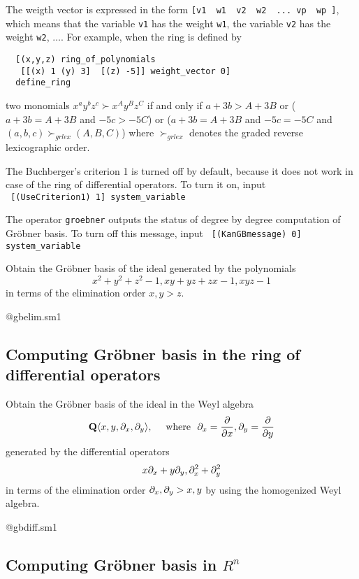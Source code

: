 The weigth vector is expressed in the form
{\tt [v1 \  w1 \ v2 \ w2 \  ... vp \ wp ]},
which
means that the variable {\tt v1} has the weight {\tt w1},
the variable {\tt v2} has the weight {\tt w2}, $\ldots$.
For example,
when the ring is defined by
\begin{verbatim}
  [(x,y,z) ring_of_polynomials 
   [[(x) 1 (y) 3]  [(z) -5]] weight_vector 0]
  define_ring
\end{verbatim}
two monomials 
$x^a y^b z^c \succ x^A y^B z^C$
if and only if
$ a+3b > A+3B$ or
($ a+3b = A+3B$ and $ -5 c > -5 C$)
or
($ a+3b = A+3B$ and $ -5 c = -5 C$ and $(a,b,c) \succ_{grlex} (A,B,C)$)
where $\succ_{grlex}$ denotes the graded reverse lexicographic order.
\bigbreak

The Buchberger's criterion 1 is turned off by default,
because it does not work in case of the ring of differential operators.
To turn it on,
input \\
\verb! [(UseCriterion1) 1] system_variable !

The operator {\tt groebner} outputs the status of degree by degree computation
of Gr\"obner basis.
To turn off this message, input
\verb! [(KanGBmessage) 0] system_variable !


\begin{example}
Obtain the Gr\"obner basis of the ideal generated by 
the polynomials 
$$x^2+y^2+z^2-1,xy+yz+zx-1,  xyz-1                   $$
in terms of the 
elimination order 
$ x,y > z. $
\end{example}

@gbelim.sm1
\bigbreak


\subsection{Computing Gr\"obner basis in the ring of differential operators}

\begin{example}
Obtain the Gr\"obner basis of the ideal in the Weyl algebra
$$  {\bf Q } \langle x,y,\pd{x},\pd{y} \rangle, \quad \hbox{ where }\ 
    \pd{x}=\frac{\partial}{\partial x},
    \pd{y}=\frac{\partial}{\partial y}
$$
generated by 
the differential operators
$$ x \partial_{x} + y \partial_{y},
   \partial_{x}^2 + \partial_{y}^2
$$
in terms of the elimination order 
$ \partial_{x}, \partial_{y} > x,y $
by using the homogenized Weyl algebra.
\end{example}

@gbdiff.sm1
\bigbreak

\subsection{Computing Gr\"obner basis in $R^n$}

